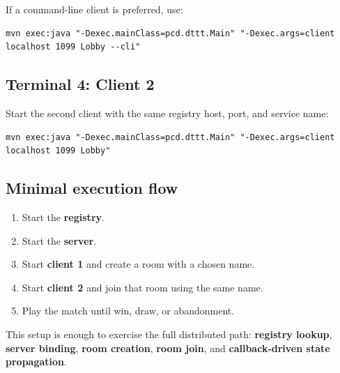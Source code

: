 If a command-line client is preferred, use:

\begin{lstlisting}[style=codestyle]
mvn exec:java "-Dexec.mainClass=pcd.dttt.Main" "-Dexec.args=client localhost 1099 Lobby --cli"
\end{lstlisting}

\subsection{Terminal 4: Client 2}

Start the second client with the same registry host, port, and service name:

\begin{lstlisting}[style=codestyle]
mvn exec:java "-Dexec.mainClass=pcd.dttt.Main" "-Dexec.args=client localhost 1099 Lobby"
\end{lstlisting}

\subsection{Minimal execution flow}

\begin{enumerate}
    \item Start the \textbf{registry}.
    \item Start the \textbf{server}.
    \item Start \textbf{client 1} and create a room with a chosen name.
    \item Start \textbf{client 2} and join that room using the same name.
    \item Play the match until win, draw, or abandonment.
\end{enumerate}

This setup is enough to exercise the full distributed path:
\textbf{registry lookup}, \textbf{server binding}, \textbf{room creation},
\textbf{room join}, and \textbf{callback-driven state propagation}.
